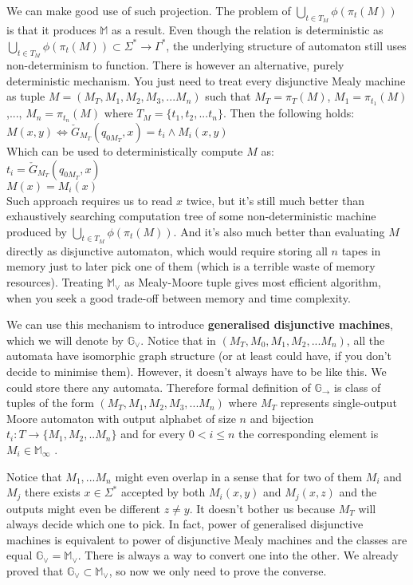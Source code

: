 \documentclass[12pt]{article}
\begin{document}
We can make good use of such projection. The problem of  $\bigcup_{t\in T_M} \phi(\pi_t(M))$ is that it produces $\mathbb{M}$ as a result. Even though the relation is deterministic as $\bigcup_{t\in T_M} \phi(\pi_t(M)) \subset \Sigma^* \rightarrow \Gamma^*$, the underlying structure of automaton still uses non-determinism to function. There is however an alternative, purely deterministic mechanism. You just need to treat every disjunctive Mealy machine as tuple $M = (M_T,M_1,M_2,M_3,...M_n)$ such that $M_T = \pi_T(M)$, $M_1 = \pi_{t_1}(M)$ ,..., $M_n = \pi_{t_n}(M)$ where $T_M = \{t_1,t_2,...t_n\}$. Then the following holds: \\
$M(x,y) \iff \check{G}_{M_T}(q_{0M_T},x) = t_i \wedge M_i(x,y)$ \\
Which can be used to deterministically compute $M$ as: \\
$t_i = \check{G}_{M_T}(q_{0M_T},x)$ \\
$M(x) = M_i(x)$ \\
Such approach requires us to read $x$ twice, but it's still much better than exhaustively searching computation tree of some non-deterministic machine produced by $\bigcup_{t\in T_M} \phi(\pi_t(M))$. And it's also much better than evaluating $M$ directly as disjunctive automaton, which would require storing all $n$ tapes in memory just to later pick one of them (which is a terrible waste of memory resources). Treating $\mathbb{M}_\vee$ as Mealy-Moore tuple gives most efficient algorithm, when you seek a good trade-off between memory and time complexity.

We can use this mechanism to introduce \textbf{generalised disjunctive machines}, which we will denote by $\mathbb{G}_\vee$. Notice that in $(M_T,M_0,M_1,M_2,...M_n)$, all the automata have isomorphic graph structure (or at least could have, if you don't decide to minimise them). However, it doesn't always have to be like this. We could store there any automata. Therefore formal definition of $\mathbb{ G}_\rightarrow$ is class of tuples of the form $(M_T,M_1,M_2,M_3,...M_n)$ where $M_T$ represents single-output Moore automaton with output alphabet of size $n$ and bijection $t_i : T \rightarrow \{M_1,M_2,..M_n\}$ and for every $0<i\le n$ the corresponding element is $M_i \in \mathbb{ M}_\infty$ .

Notice that $M_1,...M_n$ might even overlap in a sense that for two of them $M_i$ and $M_j$ there exists $x\in\Sigma^*$ accepted by both $M_i(x,y)$ and $M_j(x,z)$ and the outputs might even be different $z\ne y$. It doesn't bother us because $M_T$ will always decide which one to pick. In fact, power of generalised disjunctive machines is equivalent to power of disjunctive Mealy machines and the classes are equal $\mathbb{G}_\vee = \mathbb{M}_\vee$. There is always a way to convert one into the other. We already proved that  $\mathbb{G}_\vee \subset \mathbb{M}_\vee$, so now we only need to prove the converse.
\end{document}
